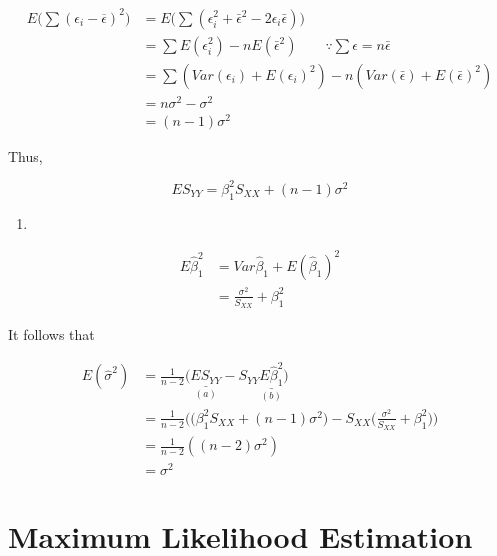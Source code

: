 \documentclass[]{book}
\theoremstyle{definition}
\theoremstyle{definition}
\theoremstyle{definition}
\theoremstyle{remark}
\begin{document}
\begin{equation*}
  \begin{split}
    E\Big( \sum (\epsilon_i - \overline{\epsilon})^2 \Big) & = E \Big( \sum (\epsilon_i^2 + \bar\epsilon^2 - 2\epsilon_i \bar\epsilon) \Big) \\
    & = \sum E(\epsilon_i^2) - n E(\bar\epsilon^2) \qquad \because \sum \epsilon = n \bar\epsilon \\
    & = \sum (Var(\epsilon_i) + E(\epsilon_i)^2) - n(Var(\bar\epsilon) + E(\bar\epsilon)^2) \\
    & = n\sigma^2 - \sigma^2 \\
    & = (n - 1)\sigma^2
  \end{split}
\end{equation*}

Thus,

\[ES_{YY} = \beta_1^2 S_{XX} + (n - 1)\sigma^2\]

\begin{enumerate}
\def\labelenumi{(\alph{enumi})}
\setcounter{enumi}{1}
\item
\end{enumerate}

\begin{equation*}
  \begin{split}
    E\hat\beta_1^2 & = Var\hat\beta_1 + E(\hat\beta_1)^2 \\
    & = \frac{\sigma^2}{S_{XX}} + \beta_1^2
  \end{split}
\end{equation*}

It follows that

\begin{equation*}
  \begin{split}
    E(\hat\sigma^2) & = \frac{1}{n - 2} \Big(  \underset{(a)}{\underline{ES_{YY}}} - S_{YY} \underset{(b)}{\underline{E\hat\beta_1^2}} \Big) \\
    & = \frac{1}{n - 2} \bigg( \Big(\beta_1^2 S_{XX} + (n - 1)\sigma^2 \Big) - S_{XX}\Big(\frac{\sigma^2}{S_{XX}} + \beta_1^2 \Big) \bigg) \\
    & = \frac{1}{n - 2}((n - 2)\sigma^2) \\
    & = \sigma^2
  \end{split}
\end{equation*}

\section{Maximum Likelihood
Estimation}\label{maximum-likelihood-estimation}
\end{document}
